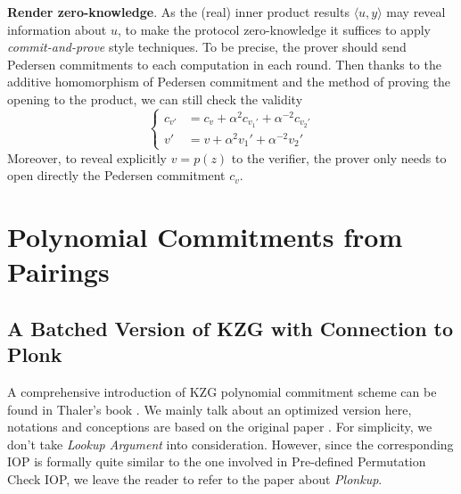 \documentclass{article}
\begin{document}
\textbf{Render zero-knowledge}. As the (real) inner product results $\langle u, y \rangle$ may reveal information about $u$, to make the protocol zero-knowledge it suffices to apply \textit{commit-and-prove} style techniques. To be precise, the prover should send Pedersen commitments to each computation in each round. Then thanks to the additive homomorphism of Pedersen commitment and the method of proving the opening to the product,  we can still check the validity 
\begin{equation*}
\begin{cases}
c_{v'} & = c_{v} + \alpha^2 c_{v_1'} + \alpha^{-2} c_{v_2'} \\
v' & = v + \alpha^2 v_1' + \alpha^{-2} v_2'
\end{cases}
\end{equation*}
Moreover, to reveal explicitly $v = p(z)$ to the verifier, the prover only needs to open directly the Pedersen commitment $c_v$.

\section{Polynomial Commitments from Pairings}

\subsection{A Batched Version of KZG with Connection to Plonk}

A comprehensive introduction of KZG polynomial commitment scheme can be found in Thaler's book \cite{ThalerBookZKP}. We mainly talk about an optimized version here, notations and conceptions are based on the original paper \cite{gabizon2019plonk}. For simplicity, we don't take \textit{Lookup Argument} into consideration. However, since the corresponding IOP is formally quite similar to the one involved in Pre-defined Permutation Check IOP, we leave the reader to refer to the paper \cite{pearson2022plonkup} about \textit{Plonkup}.
\end{document}
